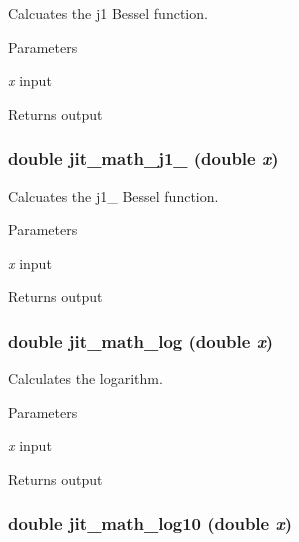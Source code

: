 Calcuates the j1 Bessel function. 
\begin{DoxyParams}{Parameters}
\item[{\em x}]input \end{DoxyParams}
\begin{DoxyReturn}{Returns}
output 
\end{DoxyReturn}
\hypertarget{group__mathmod_ga1457496cc4e0df7453df7e5c9eaf4fc9}{
\subsubsection[{jit\_\-math\_\-j1\_\-0}]{\setlength{\rightskip}{0pt plus 5cm}double jit\_\-math\_\-j1\_ (double {\em x})}}
\label{group__mathmod_ga1457496cc4e0df7453df7e5c9eaf4fc9}


Calcuates the j1\_ Bessel function. 
\begin{DoxyParams}{Parameters}
\item[{\em x}]input \end{DoxyParams}
\begin{DoxyReturn}{Returns}
output 
\end{DoxyReturn}
\hypertarget{group__mathmod_ga6543eb501e50e9b6d4c2f3ef4b22756d}{
\subsubsection[{jit\_\-math\_\-log}]{\setlength{\rightskip}{0pt plus 5cm}double jit\_\-math\_\-log (double {\em x})}}
\label{group__mathmod_ga6543eb501e50e9b6d4c2f3ef4b22756d}


Calculates the logarithm. 
\begin{DoxyParams}{Parameters}
\item[{\em x}]input \end{DoxyParams}
\begin{DoxyReturn}{Returns}
output 
\end{DoxyReturn}
\hypertarget{group__mathmod_ga6927a4753bd0f96341a17cca37e73f88}{
\subsubsection[{jit\_\-math\_\-log10}]{\setlength{\rightskip}{0pt plus 5cm}double jit\_\-math\_\-log10 (double {\em x})}}
\label{group__mathmod_ga6927a4753bd0f96341a17cca37e73f88}


